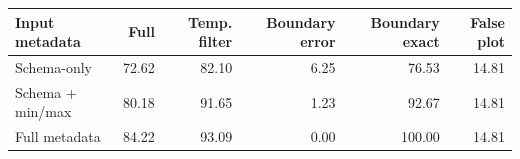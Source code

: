 \begin{tabular}{lrrrrr}
\toprule
Input metadata & Full & Temp. filter & Boundary error & Boundary exact & False plot\\
\midrule
Schema-only & 72.62 & 82.10 & 6.25 & 76.53 & 14.81\\
Schema + min/max & 80.18 & 91.65 & 1.23 & 92.67 & 14.81\\
Full metadata & 84.22 & 93.09 & 0.00 & 100.00 & 14.81\\
\bottomrule
\end{tabular}

